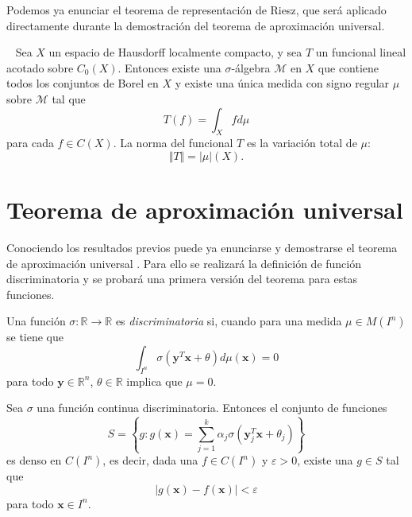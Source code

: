 Podemos ya enunciar el teorema de representación de Riesz, que será aplicado directamente durante la demostración del teorema de aproximación universal.

\begin{teorema}\label{thm:riesz} ~\cite{rudin1987real} Sea $X$ un espacio de Hausdorff localmente compacto, y sea $T$ un funcional lineal acotado sobre $C_0(X)$. Entonces existe una $\sigma$-álgebra $\mathcal{M}$ en $X$ que contiene todos los conjuntos de Borel en $X$ y existe una única medida con signo regular $\mu$ sobre $\mathcal{M}$ tal que $$ T(f) = \int_X fd\mu$$ para cada $f \in C(X)$. La norma del funcional $T$ es la variación total de $\mu$: $$\Vert T \Vert = \vert \mu \vert (X). $$
\end{teorema}

\section{Teorema de aproximación universal}

Conociendo los resultados previos puede ya enunciarse y demostrarse el teorema de aproximación universal \cite{cybenko1989approximation}. Para ello se realizará la definición de función discriminatoria y se probará una primera versión del teorema para estas funciones.

\begin{definicion} Una función $\sigma: \mathbb{R} \rightarrow \mathbb{R}$ es \textit{discriminatoria} si, cuando para una medida $\mu \in M(I^n)$ se tiene que $$\int_{I^n} \sigma(\textbf{y}^T \textbf{x} + \theta)d\mu(\textbf{x})= 0$$
para todo $\textbf{y} \in \mathbb{R}^n$, $\theta \in \mathbb{R}$ implica que $\mu = 0$.
\end{definicion}

\begin{teorema}\label{thm:discriminatorias} Sea $\sigma$ una función continua discriminatoria. Entonces el conjunto de funciones
$$S = \left\{ g: g(\textbf{x}) = \sum_{j=1}^k \alpha_j \sigma(\textbf{y}_j^T \textbf{x} + \theta_j) \right\}$$
es denso en $C(I^n)$, es decir, dada una $f \in C(I^n)$ y $\varepsilon > 0$, existe una $g \in S$ tal que
$$\left|g(\textbf{x}) - f(\textbf{x})\right| < \varepsilon$$ para todo $\textbf{x} \in I^n$.
\end{teorema}


